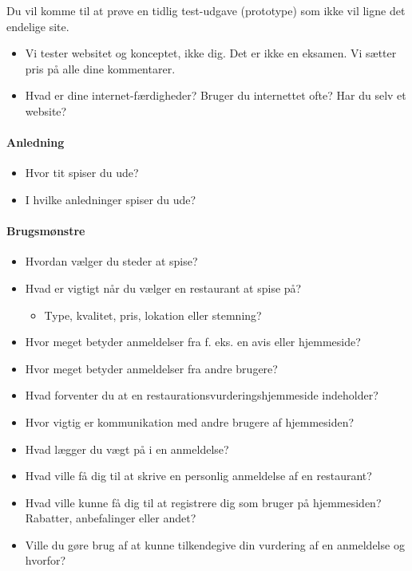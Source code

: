 \documentclass[a4paper, 12pt]{article}
\begin{document}
Du vil komme til at prøve en tidlig test-udgave (prototype) som ikke vil ligne
det endelige site.
\begin{itemize}
\item Vi tester websitet og konceptet, ikke dig. Det er ikke en
  eksamen. Vi sætter pris på alle dine kommentarer.
\item Hvad er dine internet-færdigheder? Bruger du internettet ofte?
  Har du selv et website?
\end{itemize}

\paragraph{Anledning}
\begin{itemize}
\item Hvor tit spiser du ude?
\item I hvilke anledninger spiser du ude?
\end{itemize}

\paragraph{Brugsmønstre}
\begin{itemize}
\item Hvordan vælger du steder at spise?
\item Hvad er vigtigt når du vælger en restaurant at spise på?
  \begin{itemize}
  \item Type, kvalitet, pris, lokation eller stemning?
  \end{itemize}
\item Hvor meget betyder anmeldelser fra f. eks. en avis eller hjemmeside?
\item Hvor meget betyder anmeldelser fra andre brugere?
\item Hvad forventer du at en restaurationsvurderingshjemmeside indeholder?
\item Hvor vigtig er kommunikation med andre brugere af hjemmesiden?
\item Hvad lægger du vægt på i en anmeldelse?
\item Hvad ville få dig til at skrive en personlig anmeldelse af en restaurant?
\item Hvad ville kunne få dig til at registrere dig som bruger på hjemmesiden?
Rabatter, anbefalinger eller andet?
\item Ville du gøre brug af at kunne tilkendegive din vurdering af en anmeldelse
og hvorfor?
\end{itemize}
\end{document}
